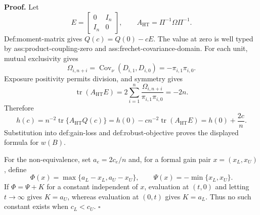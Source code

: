 \textbf{Proof.}
Let
\[
 E=\begin{bmatrix}0&I_n\\I_n&0\end{bmatrix},
 \qquad A_{\mathrm{HT}}=\Pi^{-1}\Omega\Pi^{-1}.
\]
Def:moment-matrix gives \(Q(c)=Q(0)-cE\).  The value at zero is well typed by ass:product-coupling-zero and ass:frechet-covariance-domain.  For each unit, mutual exclusivity gives
\[
 \Omega_{i,n+i}=\operatorname{Cov}_\nu(D_{i,1},D_{i,0})
 =-\pi_{i,1}\pi_{i,0}.
\]
Exposure positivity permits division, and symmetry gives
\[
 \operatorname{tr}(A_{\mathrm{HT}}E)
 =2\sum_{i=1}^n\frac{\Omega_{i,n+i}}{\pi_{i,1}\pi_{i,0}}=-2n.
\]
Therefore
\[
 h(c)=n^{-2}\operatorname{tr}\{A_{\mathrm{HT}}Q(c)\}
 =h(0)-cn^{-2}\operatorname{tr}(A_{\mathrm{HT}}E)
 =h(0)+\frac{2c}{n}.
\]
Substitution into def:gain-loss and def:robust-objective proves the displayed formula for \(w(B)\).

For the non-equivalence, set \(a_e=2c_e/n\) and, for a formal gain pair \(x=(x_L,x_U)\), define
\[
 \Phi(x)=\max\{a_L-x_L,a_U-x_U\},
 \qquad \Psi(x)=-\min\{x_L,x_U\}.
\]
If \(\Phi=\Psi+K\) for a constant independent of \(x\), evaluation at \((t,0)\) and letting \(t\to\infty\) gives \(K=a_U\), whereas evaluation at \((0,t)\) gives \(K=a_L\).  Thus no such constant exists when \(c_L<c_U\). \(\square\)